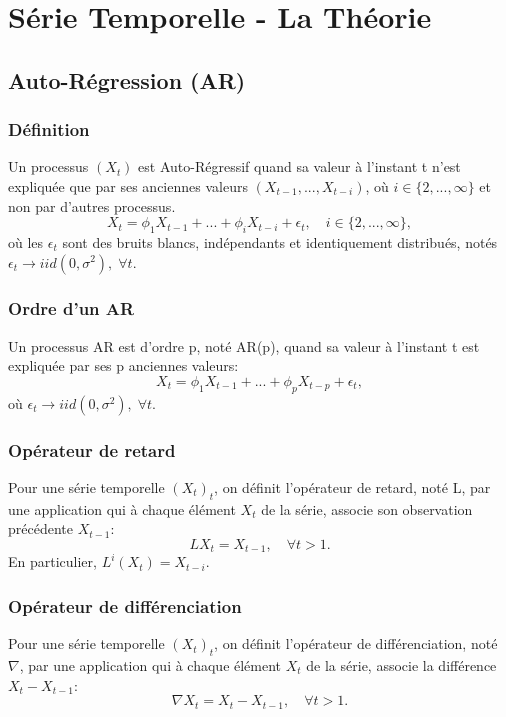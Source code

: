 \documentclass{article}
\begin{document}
\tableofcontents

\newpage

\section{Série Temporelle - La Théorie}

\subsection{Auto-Régression (AR)}

\subsubsection{Définition}
Un processus $(X_t)$ est Auto-Régressif quand sa valeur à l'instant t n'est expliquée que par ses anciennes valeurs $(X_{t-1},...,X_{t-i})$, où $i\in\{2,...,\infty\}$ et non par d'autres processus.
$$X_t=\phi_1{X_{t-1}}+...+\phi_i{X_{t-i}}+\epsilon_t, \quad i\in\{2,...,\infty\},$$
où les $\epsilon_t$ sont des bruits blancs, indépendants et identiquement distribués, notés $\epsilon_t \rightarrow iid(0,\sigma^2), \; \forall t$.

\subsubsection{Ordre d'un AR}
Un processus AR est d'ordre p, noté AR(p), quand sa valeur à l'instant t est expliquée par ses p anciennes valeurs: 
$$X_t=\phi_1{X_{t-1}}+...+\phi_p{X_{t-p}}+\epsilon_t,$$
où $\epsilon_t \rightarrow iid(0,\sigma^2), \; \forall t$.

\subsubsection{Opérateur de retard}
Pour une série temporelle $(X_t)_t$, on définit l'opérateur de retard, noté L, par une application qui à chaque élément $X_t$ de la série, associe son observation précédente $X_{t-1}$:
$$LX_t=X_{t-1}, \quad \forall t>1.$$
En particulier, $L^i(X_t)=X_{t-i}$.

\subsubsection{Opérateur de différenciation}
Pour une série temporelle $(X_t)_t$, on définit l'opérateur de différenciation, noté $\nabla$, par une application qui à chaque élément $X_t$ de la série, associe la différence $X_t-X_{t-1}$:
$$\nabla{X_t}=X_t-X_{t-1}, \quad \forall t>1.$$
\end{document}
